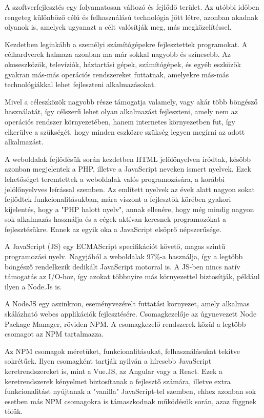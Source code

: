
A szoftverfejlesztés egy folyamatosan változó és fejlődő terület. Az utóbbi időben rengeteg különböző célú és felhasználású technológia jött létre, azonban akadnak olyanok is, amelyek ugyanazt a célt valósítják meg, más megközelítéssel.

Kezdetben leginkább a személyi számítógépekre fejlesztettek programokat. A célhardverek halmaza azonban ma már sokkal nagyobb és színesebb. Az okoseszközök, televíziók, háztartási gépek, számítógépek, és egyéb eszközök gyakran más-más operációs rendszereket futtatnak, amelyekre más-más technológiákkal lehet fejleszteni alkalmazásokat.

Mivel a céleszközök nagyobb része támogatja valamely, vagy akár több böngésző használatát, így célszerű lehet olyan alkalmazást fejleszteni, amely nem az operációs rendszer környezetében, hanem internetes környezetben fut, így elkerülve a szükségét, hogy minden eszközre szükség legyen megírni az adott alkalmazást.

A weboldalak fejlődésük során kezdetben HTML jelölőnyelven íródtak, később azonban megjelentek a PHP, illetve a JavaScript neveken ismert nyelvek. Ezek  lehetőséget teremtettek a weboldalak valós programozására, a korábbi jelölőnyelvves leírással szemben. Az említett nyelvek az évek alatt nagyon sokat fejlődtek funkcionalitásukban, mára viszont a fejlesztők körében gyakori kijelentés, hogy a "PHP halott nyelv", annak ellenére, hogy még mindig nagyon sok alkalmazás használja és a cégek aktívan keresnek programozókat a fejlesztésükre. Ennek az egyik oka a JavaScript elsöprő népszerűsége.

A  JavaScript (JS) egy ECMAScript specifikációt követő, magas szintű programozási nyelv. Nagyjából a weboldalak 97\%-a használja, így a legtöbb böngésző rendelkezik dedikált JavaScript motorral is. A JS-ben nincs natív támogatás az I/O-hoz, így azokat többnyire más környezettel biztosítják, például ilyen a Node.Js is. \cite{javascript}

A NodeJS egy aszinkron, eseményvezérelt futtatási környezet, amely alkalmas skálázható webes applikációk fejlesztésére. Csomagkezelője az úgynevezett Node Package Manager, röviden NPM. A csomagkezelő rendszerek közül a legtöbb csomagot az NPM tartalmazza.

Az NPM csomagok méretüket, funkcionalitásukat, felhasználásukat tekitve sokrétűek. Ilyen csomagként tartják nyilván a híresebb JavaScript keretrendszereket is, mint a Vue.JS, az Angular vagy a React. Ezek a keretrendszerek kényelmet biztosítanak a fejlesztő számára, illetve extra funkcionalitást nyújtanak a "vanilla" JavaScript-tel szemben, ehhez azonban sok esetben más NPM csomagokra is támaszkodnak működésük során, azaz függnek tőlük.

